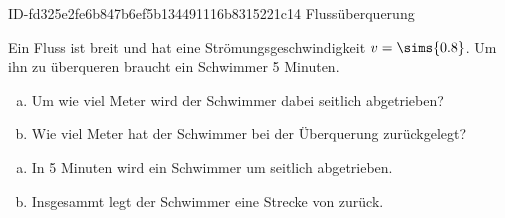 \begin{exercise}
      {ID-fd325e2fe6b847b6ef5b134491116b8315221c14}
      {Flussüberquerung}
  \ifproblem\problem\par
    Ein Fluss ist  breit und hat eine Strömungsgeschwindigkeit
    $v=\sims{0.8}$. Um ihn zu überqueren braucht ein Schwimmer \num{5} Minuten.
    \begin{enumerate}[a)]
      \item Um wie viel Meter wird der Schwimmer dabei seitlich abgetrieben?
      \item Wie viel Meter hat der Schwimmer bei der Überquerung zurückgelegt?
    \end{enumerate}
  \fi
  \ifoutcome\outcome\par
    \begin{enumerate}[a)]
      \item In \num{5} Minuten wird ein Schwimmer um  seitlich abgetrieben.
      \item Insgesammt legt der Schwimmer eine Strecke von  zurück.
    \end{enumerate}
  \fi
\end{exercise}
